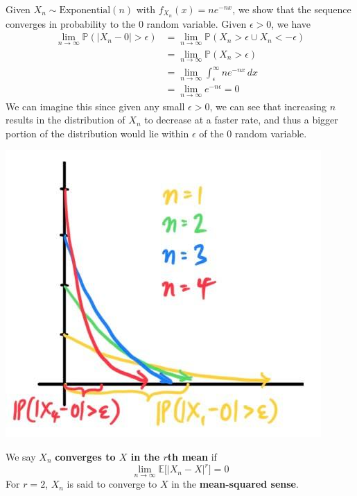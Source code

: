 \documentclass{article}
\begin{document}
    \begin{example}
      Given $X_n \sim \mathrm{Exponential}(n)$ with $f_{X_n} (x) = n e^{-nx}$, we show that the sequence converges in probability to the $0$ random variable. Given $\epsilon > 0$, we have 
      \begin{align*}
        \lim_{n \rightarrow \infty} \mathbb{P}(|X_n - 0| > \epsilon) & = \lim_{n \rightarrow \infty} \mathbb{P}(X_n > \epsilon \cup X_n < -\epsilon) \\
        & = \lim_{n \rightarrow \infty} \mathbb{P}(X_n > \epsilon) \\
        & = \lim_{n \rightarrow \infty} \int_\epsilon^\infty n e^{-nx} \,dx \\
        & = \lim_{n \rightarrow \infty} e^{-n \epsilon} = 0
      \end{align*}
      We can imagine this since given any small $\epsilon > 0$, we can see that increasing $n$ results in the distribution of $X_n$ to decrease at a faster rate, and thus a bigger portion of the distribution would lie within $\epsilon$ of the $0$ random variable. 
      \begin{center}
        \includegraphics[scale=0.3]{img/convergence_in_prob_exponential.jpg}
      \end{center}
    \end{example}

    \begin{definition}
      We say $X_n$ \textbf{converges to $X$ in the $r$th mean} if 
      \begin{equation}
        \lim_{n \rightarrow \infty} \mathbb{E} \big[ |X_n - X|^r \big] = 0
      \end{equation}
      For $r = 2$, $X_n$ is said to converge to $X$ in the \textbf{mean-squared sense}. 
    \end{definition}
\end{document}
